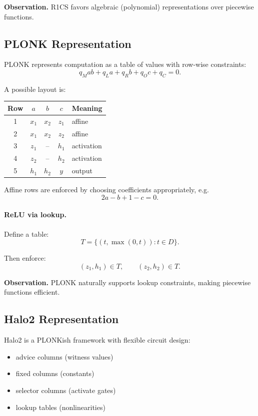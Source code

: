 \medskip

\noindent
\textbf{Observation.}  
R1CS favors algebraic (polynomial) representations over piecewise functions.

\subsection{PLONK Representation}

PLONK represents computation as a table of values with row-wise constraints:
\[
q_M ab + q_L a + q_R b + q_O c + q_C = 0.
\]

A possible layout is:

\begin{center}
\begin{tabular}{c|ccc|l}
Row & $a$ & $b$ & $c$ & Meaning \\
\hline
1 & $x_1$ & $x_2$ & $z_1$ & affine \\
2 & $x_1$ & $x_2$ & $z_2$ & affine \\
3 & $z_1$ & -- & $h_1$ & activation \\
4 & $z_2$ & -- & $h_2$ & activation \\
5 & $h_1$ & $h_2$ & $y$ & output
\end{tabular}
\end{center}

Affine rows are enforced by choosing coefficients appropriately, e.g.
\[
2a - b + 1 - c = 0.
\]

\paragraph{ReLU via lookup.}

Define a table:
\[
T = \{(t, \max(0,t)) : t \in D\}.
\]

Then enforce:
\[
(z_1, h_1) \in T, \qquad (z_2, h_2) \in T.
\]

\medskip

\noindent
\textbf{Observation.}  
PLONK naturally supports lookup constraints, making piecewise functions efficient.

\subsection{Halo2 Representation}

Halo2 is a PLONKish framework with flexible circuit design:

\begin{itemize}
\item advice columns (witness values)
\item fixed columns (constants)
\item selector columns (activate gates)
\item lookup tables (nonlinearities)
\end{itemize}

